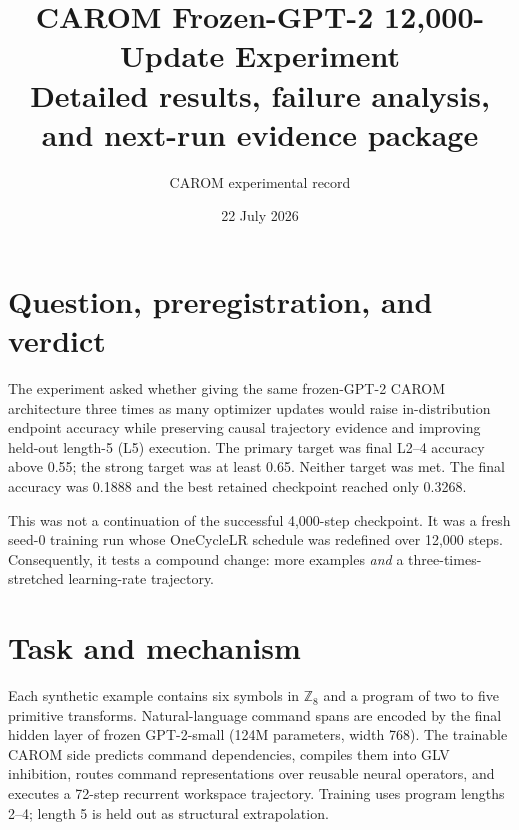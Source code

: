 \documentclass[10pt]{article}
\title{\textbf{CAROM Frozen-GPT-2 12,000-Update Experiment}\\
Detailed results, failure analysis, and next-run evidence package}
\author{CAROM experimental record}\date{22 July 2026}
\begin{document}
\maketitle

\begin{center}
\end{center}

\section{Question, preregistration, and verdict}
The experiment asked whether giving the same frozen-GPT-2 CAROM architecture
three times as many optimizer updates would raise in-distribution endpoint
accuracy while preserving causal trajectory evidence and improving held-out
length-5 (L5) execution. The primary target was final L2--4 accuracy above
0.55; the strong target was at least 0.65. Neither target was met. The final
accuracy was 0.1888 and the best retained checkpoint reached only 0.3268.

This was not a continuation of the successful 4,000-step checkpoint. It was a
fresh seed-0 training run whose OneCycleLR schedule was redefined over 12,000
steps. Consequently, it tests a compound change: more examples \emph{and} a
three-times-stretched learning-rate trajectory.

\section{Task and mechanism}
Each synthetic example contains six symbols in $\mathbb{Z}_8$ and a program of
two to five primitive transforms. Natural-language command spans are encoded by
the final hidden layer of frozen GPT-2-small (124M parameters, width 768). The
trainable CAROM side predicts command dependencies, compiles them into GLV
inhibition, routes command representations over reusable neural operators, and
executes a 72-step recurrent workspace trajectory. Training uses program lengths
2--4; length 5 is held out as structural extrapolation.
\end{document}
